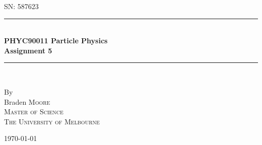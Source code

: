 \documentclass[a4paper]{article} %
\begin{document}
\pagestyle{empty}

\newcommand{\HRule}{\rule{\linewidth}{0.5mm}}

\begin{titlepage}

    \begin{center}
        \textsc{\large SN: 587623}\\[6cm]

        \HRule \\[0.5cm]
		\Huge \textbf{PHYC90011 Particle Physics}\\[0.5cm]
        \huge \textbf{Assignment 5}\\[0.5cm] 
        \HRule \\[1.5cm]
        \begin{minipage}{0.4\textwidth}
        \begin{center}

        \large By \\[0.75cm]
        \huge Braden \scshape Moore \\[0.5cm]
        \normalsize \normalfont Master of Science \\
        The University of Melbourne \\

        \end{center}
        \end{minipage}

        \vfill

        \large \today
    \end{center}

\newpage
\end{titlepage}
\pagestyle{fancy}
\lfoot{\textsc{\today}}
\setcounter{page}{1}
\end{document}
